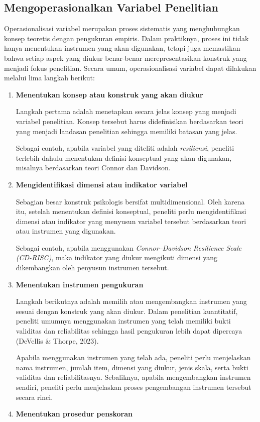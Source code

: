 \documentclass[
  indonesian,
  letterpaper,
  DIV=11,
  numbers=noendperiod]{scrreprt}
\begin{document}
\subsection{Mengoperasionalkan Variabel
Penelitian}\label{mengoperasionalkan-variabel-penelitian}

Operasionalisasi variabel merupakan proses sistematis yang menghubungkan
konsep teoretis dengan pengukuran empiris. Dalam praktiknya, proses ini
tidak hanya menentukan instrumen yang akan digunakan, tetapi juga
memastikan bahwa setiap aspek yang diukur benar-benar merepresentasikan
konstruk yang menjadi fokus penelitian. Secara umum, operasionalisasi
variabel dapat dilakukan melalui lima langkah berikut:

\begin{enumerate}
\def\labelenumi{\arabic{enumi}.}
\item
  \textbf{Menentukan konsep atau konstruk yang akan diukur}

  Langkah pertama adalah menetapkan secara jelas konsep yang menjadi
  variabel penelitian. Konsep tersebut harus didefinisikan berdasarkan
  teori yang menjadi landasan penelitian sehingga memiliki batasan yang
  jelas.

  Sebagai contoh, apabila variabel yang diteliti adalah
  \emph{resiliensi}, peneliti terlebih dahulu menentukan definisi
  konseptual yang akan digunakan, misalnya berdasarkan teori Connor dan
  Davidson.
\item
  \textbf{Mengidentifikasi dimensi atau indikator variabel}

  Sebagian besar konstruk psikologis bersifat multidimensional. Oleh
  karena itu, setelah menentukan definisi konseptual, peneliti perlu
  mengidentifikasi dimensi atau indikator yang menyusun variabel
  tersebut berdasarkan teori atau instrumen yang digunakan.

  Sebagai contoh, apabila menggunakan \emph{Connor--Davidson Resilience
  Scale (CD-RISC)}, maka indikator yang diukur mengikuti dimensi yang
  dikembangkan oleh penyusun instrumen tersebut.
\item
  \textbf{Menentukan instrumen pengukuran}

  Langkah berikutnya adalah memilih atau mengembangkan instrumen yang
  sesuai dengan konstruk yang akan diukur. Dalam penelitian kuantitatif,
  peneliti umumnya menggunakan instrumen yang telah memiliki bukti
  validitas dan reliabilitas sehingga hasil pengukuran lebih dapat
  dipercaya (DeVellis \& Thorpe, 2023).

  Apabila menggunakan instrumen yang telah ada, peneliti perlu
  menjelaskan nama instrumen, jumlah item, dimensi yang diukur, jenis
  skala, serta bukti validitas dan reliabilitasnya. Sebaliknya, apabila
  mengembangkan instrumen sendiri, peneliti perlu menjelaskan proses
  pengembangan instrumen tersebut secara rinci.
\item
  \textbf{Menentukan prosedur penskoran}


\end{enumerate}
\end{document}
